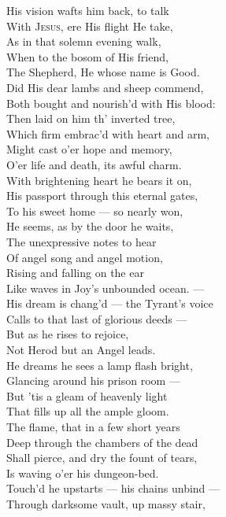  His vision wafts him back, to talk \\
 With \textsc{Jesus}, ere His flight He take, \\
 As in that solemn evening walk, \\
  When to the bosom of His friend, \\
 The Shepherd, He whose name is Good. \\
 Did His dear lambs and sheep commend, \\
 Both bought and nourish’d with His blood: \\
  Then laid on him th’ inverted tree, \\
 Which firm embrac’d with heart and arm, \\
 Might cast o’er hope and memory, \\
 O’er life and death, its awful charm. \\
  With brightening heart he bears it on, \\
 His passport through this eternal gates, \\
 To his sweet home — so nearly won, \\
 He seems, as by the door he waits, \\
  The unexpressive notes to hear \\
 Of angel song and angel motion, \\
 Rising and falling on the ear \\
 Like waves in Joy’s unbounded ocean. — \\
  His dream is chang’d — the Tyrant’s voice \\
 Calls to that last of glorious deeds — \\
 But as he rises to rejoice, \\
 Not Herod but an Angel leads. \\
  He dreams he sees a lamp flash bright, \\
 Glancing around his prison room — \\
 But ’tis a gleam of heavenly light \\
 That fills up all the ample gloom. \\
  The flame, that in a few short years \\
 Deep through the chambers of the dead \\
 Shall pierce, and dry the fount of tears, \\
 Is waving o’er his dungeon-bed. \\
  Touch’d he upstarts — his chains unbind — \\
 Through darksome vault, up massy stair, \\

